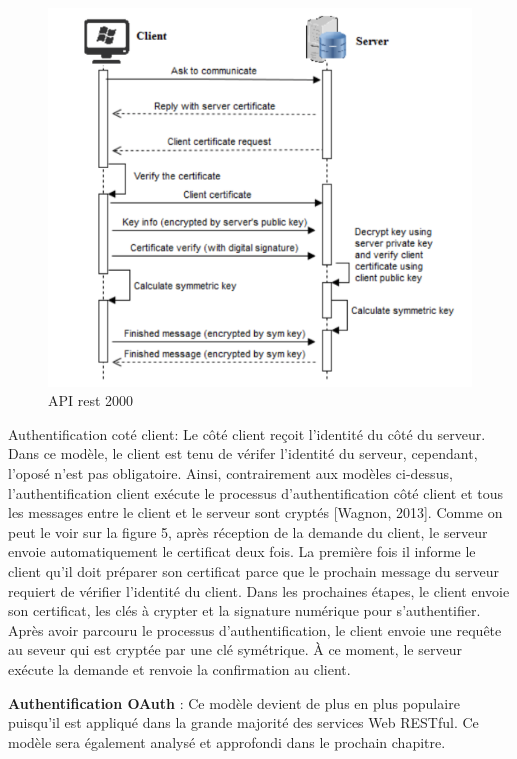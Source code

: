 \begin{figure}[! ht ]
			\centering
			\includegraphics[scale=.4]{./images/api_client_authentication.png}
			\caption {API rest 2000}
		\end{figure}

Authentification coté client: Le côté client reçoit l'identité du côté du serveur. Dans ce modèle, le client est tenu de vérifer l'identité du serveur, cependant, l'oposé n'est pas obligatoire. Ainsi, contrairement aux modèles ci-dessus, l'authentification client exécute le processus d'authentification côté client et tous les messages entre le client et le serveur sont cryptés [Wagnon, 2013].
Comme on peut le voir sur la figure 5, après réception de la demande du client, le serveur envoie automatiquement le certificat deux fois. La première fois il informe le client qu'il doit préparer son certificat  parce que le prochain message du serveur requiert de vérifier l'identité du client. Dans les prochaines étapes, le client envoie son certificat, les clés à crypter et la signature numérique pour s'authentifier. Après avoir parcouru le processus d'authentification, le client envoie une requête au seveur qui est cryptée par une clé symétrique. À ce moment, le serveur exécute la demande et renvoie la confirmation au client.

\textbf{Authentification OAuth} : Ce modèle devient de plus en plus populaire puisqu'il est appliqué dans la grande majorité des services Web RESTful. Ce modèle sera également analysé et approfondi dans le prochain chapitre.

